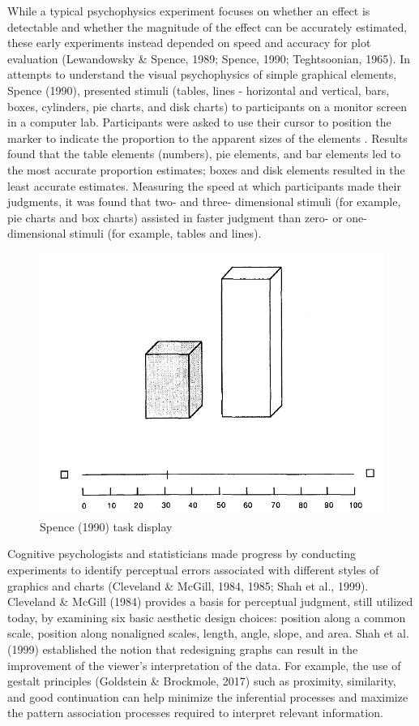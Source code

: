 \documentclass[print]{nuthesis}
\begin{document}
While a typical psychophysics experiment focuses on whether an effect is detectable and whether the magnitude of the effect can be accurately estimated, these early experiments instead depended on speed and accuracy for plot evaluation (Lewandowsky \& Spence, 1989; Spence, 1990; Teghtsoonian, 1965).
In attempts to understand the visual psychophysics of simple graphical elements, Spence (1990), presented stimuli (tables, lines - horizontal and vertical, bars, boxes, cylinders, pie charts, and disk charts) to participants on a monitor screen in a computer lab.
Participants were asked to use their cursor to position the marker to indicate the proportion to the apparent sizes of the elements .
Results found that the table elements (numbers), pie elements, and bar elements led to the most accurate proportion estimates; boxes and disk elements resulted in the least accurate estimates.
Measuring the speed at which participants made their judgments, it was found that two- and three- dimensional stimuli (for example, pie charts and box charts) assisted in faster judgment than zero- or one- dimensional stimuli (for example, tables and lines).

\begin{figure}[tbp]

{\centering \includegraphics[width=0.75\linewidth,]{images/spence-1990-proportion} 

}

\caption{Spence (1990) task display}\label{fig:spence-1990-proportion}
\end{figure}

Cognitive psychologists and statisticians made progress by conducting experiments to identify perceptual errors associated with different styles of graphics and charts (Cleveland \& McGill, 1984, 1985; Shah et al., 1999).
Cleveland \& McGill (1984) provides a basis for perceptual judgment, still utilized today, by examining six basic aesthetic design choices: position along a common scale, position along nonaligned scales, length, angle, slope, and area.
Shah et al. (1999) established the notion that redesigning graphs can result in the improvement of the viewer's interpretation of the data.
For example, the use of gestalt principles (Goldstein \& Brockmole, 2017) such as proximity, similarity, and good continuation can help minimize the inferential processes and maximize the pattern association processes required to interpret relevant information.
\end{document}
